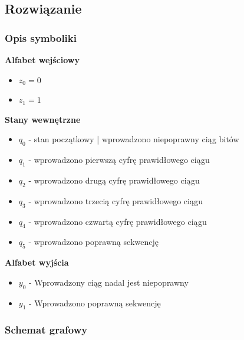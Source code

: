 \documentclass[a4paper,12pt]{extarticle}  %
\begin{document}
\subsection{Rozwiązanie}
\subsubsection{Opis symboliki}
\textbf{Alfabet wejściowy}
\begin{itemize}
    \item $z_0 = 0$
    \item $z_1 = 1$
\end{itemize}
\textbf{Stany wewnętrzne}
\begin{itemize}
    \item $q_0$ - stan początkowy | wprowadzono niepoprawny ciąg bitów
    \item $q_1$ - wprowadzono pierwszą cyfrę prawidłowego ciągu
    \item $q_2$ - wprowadzono drugą cyfrę prawidłowego ciągu
    \item $q_3$ - wprowadzono trzecią cyfrę prawidłowego ciągu
    \item $q_4$ - wprowadzono czwartą cyfrę prawidłowego ciągu
    \item $q_5$ - wprowadzono poprawną sekwencję
\end{itemize}
\textbf{Alfabet wyjścia}
\begin{itemize}
    \item $y_0$ - Wprowadzony ciąg nadal jest niepoprawny
    \item $y_1$ - Wprowadzono poprawną sekwencję
\end{itemize}
\subsubsection{Schemat grafowy}
\begin{figure}[H]
	\centering
\end{figure}
\end{document}
